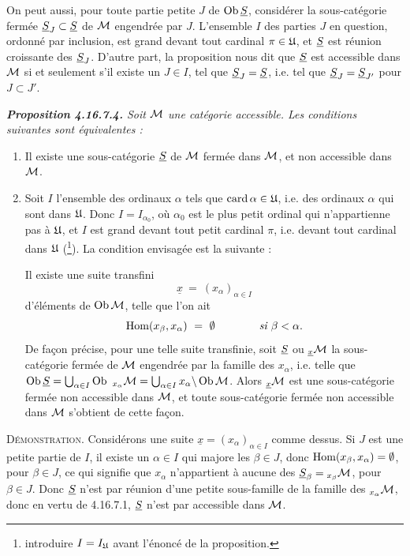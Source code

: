 On peut aussi, pour toute partie petite $J$ de $\operatorname{Ob} \underline{S}$, considérer la sous-catégorie fermée $\underline{S}_J \subset \underline{S}$ de $\mathcal{M}$ engendrée par $J$. L'ensemble $I$ des parties $J$ en question, ordonné par inclusion, est grand devant tout cardinal $\pi \in \mathfrak{U}$, et $\underline{S}$ est réunion croissante des $\underline{S}_J$. D'autre part, la proposition nous dit que $\underline{S}$ est accessible dans $\mathcal{M}$ si et seulement s'il existe un $J \in I$, tel que $\underline{S}_J = \underline{S}$, i.e. tel que $\underline{S}_J = \underline{S}_{J'}$ pour $J \subset J'$.

\begingroup\itshape
\noindent\textbf{\upshape Proposition 4.16.7.4.} Soit $\mathcal{M}$ une catégorie accessible. Les conditions suivantes sont équivalentes :
\begin{enumerate}[label={}]
\item[a)] Il existe une sous-catégorie $\underline{S}$ de $\mathcal{M}$ fermée dans $\mathcal{M}$, et non accessible dans $\mathcal{M}$.
\item[b)] Soit $I$ l'ensemble des ordinaux $\alpha$ tels que $\operatorname{card} \alpha \in \mathfrak{U}$, i.e. des
ordinaux $\alpha$ qui sont dans $\mathfrak{U}$. Donc $I = I_{\alpha_0}$, où $\alpha_0$ est le plus petit ordinal qui n'appartienne pas à $\mathfrak{U}$, et $I$ est grand devant tout petit cardinal $\pi$, i.e. devant tout cardinal dans $\mathfrak{U}$ \textup{(}\footnote{introduire $I = I_{\mathfrak{U}}$ avant l'énoncé de la proposition.}\textup{)}. La condition envisagée est la suivante :

Il existe une suite transfini %
\[
\underline{x} \ =\ (x_\alpha)_{\alpha\in I}
\]
d'éléments de $\operatorname{Ob} \mathcal{M}$, telle que l'on ait
\[
\operatorname{Hom}(x_\beta, x_\alpha) \ =\ \emptyset \qquad\qquad \textit{si } \beta < \alpha.
\]
De façon précise, pour une telle suite transfinie, soit $\underline{S}$ ou ${}_{\underline{x}}\mathcal{M}$ la sous-catégorie fermée de $\mathcal{M}$ engendrée par la famille des $x_\alpha$, i.e. telle que $\operatorname{Ob} \underline{S} = \bigcup_{\alpha\in I} \operatorname{Ob}\ {}_{x_\alpha}\mathcal{M} = \bigcup_{\alpha\in I} x_\alpha\backslash\operatorname{Ob} \mathcal{M}$. Alors ${}_{\underline{x}}\mathcal{M}$ est une sous-catégorie fermée non accessible dans $\mathcal{M}$, et toute sous-catégorie fermée non accessible dans $\mathcal{M}$ s'obtient de cette façon.
\end{enumerate}
\endgroup

\textsc{Démonstration}. Considérons une suite $\underline{x} = (x_\alpha)_{\alpha\in I}$ comme dessus. Si $J$ est une petite partie de $I$, il existe un $\alpha \in I$ qui majore les $\beta \in J$, donc $\operatorname{Hom}(x_\beta, x_\alpha) = \emptyset$, pour $\beta \in J$,
ce qui signifie que $x_\alpha$ n'appartient à aucune des $\underline{S}_\beta = {}_{x_\beta}\mathcal{M}$, pour $\beta \in J$. Donc $\underline{S}$ n'est par réunion d'une petite sous-famille de la famille des ${}_{x_\alpha}\mathcal{M}$, donc en vertu de 4.16.7.1, $\underline{S}$ n'est par accessible dans $\mathcal{M}$. %

